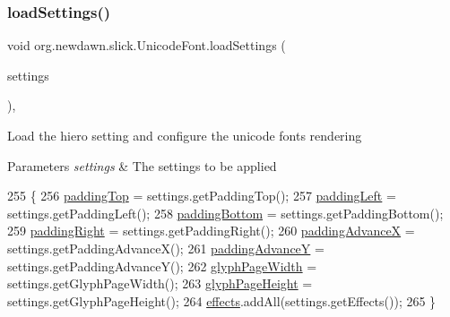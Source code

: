 \subsubsection{\texorpdfstring{load\+Settings()}{loadSettings()}}
{\footnotesize\ttfamily void org.\+newdawn.\+slick.\+Unicode\+Font.\+load\+Settings (\begin{DoxyParamCaption}\item[{\mbox{\hyperlink{classorg_1_1newdawn_1_1slick_1_1font_1_1_hiero_settings}{Hiero\+Settings}}}]{settings }\end{DoxyParamCaption})\hspace{0.3cm}{\ttfamily [inline]}, {\ttfamily [private]}}

Load the hiero setting and configure the unicode font\textquotesingle{}s rendering


\begin{DoxyParams}{Parameters}
{\em settings} & The settings to be applied \\
\hline
\end{DoxyParams}

\begin{DoxyCode}
255                                                       \{
256         \mbox{\hyperlink{classorg_1_1newdawn_1_1slick_1_1_unicode_font_acadcc8c595615d077e2c0039818292f2}{paddingTop}} = settings.getPaddingTop();
257         \mbox{\hyperlink{classorg_1_1newdawn_1_1slick_1_1_unicode_font_a2c0919e4c3c800093767e29827064b0e}{paddingLeft}} = settings.getPaddingLeft();
258         \mbox{\hyperlink{classorg_1_1newdawn_1_1slick_1_1_unicode_font_a101f8814305c63cba7b7bbb7d1bf87ae}{paddingBottom}} = settings.getPaddingBottom();
259         \mbox{\hyperlink{classorg_1_1newdawn_1_1slick_1_1_unicode_font_ac488d6ccaeeb1d846fb5fc796a4e4ff2}{paddingRight}} = settings.getPaddingRight();
260         \mbox{\hyperlink{classorg_1_1newdawn_1_1slick_1_1_unicode_font_a347a5d8b2baa6ab7f037d5f869504883}{paddingAdvanceX}} = settings.getPaddingAdvanceX();
261         \mbox{\hyperlink{classorg_1_1newdawn_1_1slick_1_1_unicode_font_ac04c92b5304822a4187a2e7184f4aca8}{paddingAdvanceY}} = settings.getPaddingAdvanceY();
262         \mbox{\hyperlink{classorg_1_1newdawn_1_1slick_1_1_unicode_font_a3fe610a3c34ca1aa69a118601e8cb2bc}{glyphPageWidth}} = settings.getGlyphPageWidth();
263         \mbox{\hyperlink{classorg_1_1newdawn_1_1slick_1_1_unicode_font_ac919dac32be8c1baf29a21625e0719b9}{glyphPageHeight}} = settings.getGlyphPageHeight();
264         \mbox{\hyperlink{classorg_1_1newdawn_1_1slick_1_1_unicode_font_a57bc565e86127d8f7c0d7bcfa2f6dc56}{effects}}.addAll(settings.getEffects());
265     \}
\end{DoxyCode}
\mbox{\label{classorg_1_1newdawn_1_1slick_1_1_unicode_font_a573d6193d464b5936b9846da9b2e28bd}} 
